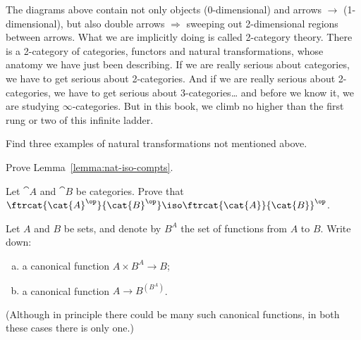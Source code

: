 \begin{remarks}
The diagrams above contain not only objects (0-dimensional) and arrows
$\to$ (1-dimensional), but also double arrows $\Rightarrow$ sweeping out
2-dimensional regions between arrows.  What we are implicitly doing is
called 2-category%
%
%
theory.  There is a 2-category%
%
%
of categories, functors and natural transformations, whose anatomy we have
just been describing.  If we are really serious about categories, we have
to get serious about 2-categories.  And if we are really serious about
2-categories, we have to get serious about 3-categories\ldots%
%
%
and before we know it, we are studying $\infty$-categories.%
%
%
But in this book, we climb no higher than the first rung or two of this
infinite ladder.%
%
%

\end{remarks}


\exs


\begin{question}
Find three examples of natural transformations not mentioned above.
\end{question}


\begin{question}        
\label{ex:nat-iso-compts}
Prove Lemma~\ref{lemma:nat-iso-compts}.
\end{question}


\begin{question}
Let $\cat{A}$ and $\cat{B}$ be categories.  Prove that
$\ftrcat{\cat{A}^\op}{\cat{B}^\op} \iso \ftrcat{\cat{A}}{\cat{B}}^\op$.
\end{question}


\begin{question}
Let $A$ and $B$ be sets, and denote by $B^A$ the set of functions from $A$
to $B$.  Write down:
% 
\begin{enumerate}[(b)]
\item 
a canonical function $A \times B^A \to B$;%
%
%

\item 
a canonical function $A \to B^{(B^A)}$.
\end{enumerate}
% 
(Although in principle there could be many such canonical functions,
in both these cases there is only one.)
\end{question}


